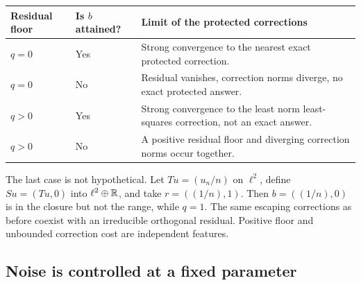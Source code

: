 \begin{center}
\begin{tabularx}{\linewidth}{@{}p{.17\linewidth}p{.26\linewidth}X@{}}
\toprule Residual floor & Is $b$ attained? & Limit of the protected corrections\\\midrule
$q=0$ & Yes & Strong convergence to the nearest exact protected correction.\\[3pt]
$q=0$ & No & Residual vanishes, correction norms diverge, no exact protected answer.\\[3pt]
$q>0$ & Yes & Strong convergence to the least norm least-squares correction, not an exact answer.\\[3pt]
$q>0$ & No & A positive residual floor and diverging correction norms occur together.\\\bottomrule
\end{tabularx}
\end{center}

The last case is not hypothetical. Let $Tu=(u_n/n)$ on $\ell^2$, define $Su=(Tu,0)$ into $\ell^2\oplus\mathbb R$, and take $r=((1/n),1)$. Then $b=((1/n),0)$ is in the closure but not the range, while $q=1$. The same escaping corrections as before coexist with an irreducible orthogonal residual. Positive floor and unbounded correction cost are independent features.

\subsection{Noise is controlled at a fixed parameter}

